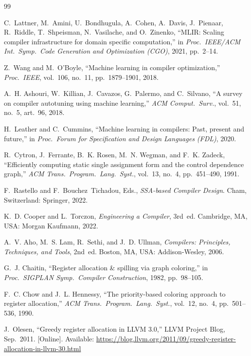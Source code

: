 \documentclass{ieeeaccess}
\begin{document}
\begin{thebibliography}{99}
\footnotesize

C.~Lattner, M.~Amini, U.~Bondhugula, A.~Cohen, A.~Davis, J.~Pienaar,
R.~Riddle, T.~Shpeisman, N.~Vasilache, and O.~Zinenko, ``MLIR: Scaling
compiler infrastructure for domain specific computation,'' in
\emph{Proc.\ IEEE/ACM Int.\ Symp.\ Code Generation and Optimization
(CGO)}, 2021, pp.~2--14.

Z.~Wang and M.~O'Boyle, ``Machine learning in compiler optimization,''
\emph{Proc.\ IEEE}, vol.~106, no.~11, pp.~1879--1901, 2018.

A.~H. Ashouri, W.~Killian, J.~Cavazos, G.~Palermo, and C.~Silvano, ``A
survey on compiler autotuning using machine learning,'' \emph{ACM
Comput.\ Surv.}, vol.~51, no.~5, art.~96, 2018.

H.~Leather and C.~Cummins, ``Machine learning in compilers: Past,
present and future,'' in \emph{Proc.\ Forum for Specification and
Design Languages (FDL)}, 2020.

R.~Cytron, J.~Ferrante, B.~K. Rosen, M.~N. Wegman, and F.~K. Zadeck,
``Efficiently computing static single assignment form and the control
dependence graph,'' \emph{ACM Trans.\ Program.\ Lang.\ Syst.}, vol.~13,
no.~4, pp.~451--490, 1991.

F.~Rastello and F.~Bouchez~Tichadou, Eds., \emph{SSA-based Compiler
Design}. Cham, Switzerland: Springer, 2022.

K.~D. Cooper and L.~Torczon, \emph{Engineering a Compiler}, 3rd~ed.
Cambridge, MA, USA: Morgan Kaufmann, 2022.

A.~V. Aho, M.~S. Lam, R.~Sethi, and J.~D. Ullman, \emph{Compilers:
Principles, Techniques, and Tools}, 2nd~ed. Boston, MA, USA:
Addison-Wesley, 2006.

G.~J. Chaitin, ``Register allocation \& spilling via graph coloring,''
in \emph{Proc.\ SIGPLAN Symp.\ Compiler Construction}, 1982,
pp.~98--105.

F.~C. Chow and J.~L. Hennessy, ``The priority-based coloring approach
to register allocation,'' \emph{ACM Trans.\ Program.\ Lang.\ Syst.},
vol.~12, no.~4, pp.~501--536, 1990.

J.~Olesen, ``Greedy register allocation in LLVM 3.0,'' LLVM Project
Blog, Sep.~2011. [Online]. Available:
\url{https://blog.llvm.org/2011/09/greedy-register-allocation-in-llvm-30.html}


\end{thebibliography}
\end{document}
